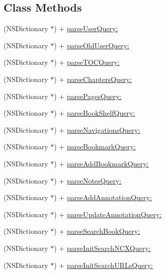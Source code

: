 \subsection*{Class Methods}
\begin{DoxyCompactItemize}
\item 
(N\-S\-Dictionary $\ast$) + \hyperlink{interface_pxe_player_query_parser_ad5159d6e940ef142f684fa4420a528b8}{parse\-User\-Query\-:}
\item 
(N\-S\-Dictionary $\ast$) + \hyperlink{interface_pxe_player_query_parser_aa19368a452433d48bd44fcba38e51d3d}{parse\-Old\-User\-Query\-:}
\item 
(N\-S\-Dictionary $\ast$) + \hyperlink{interface_pxe_player_query_parser_a186fec770cd3b8f5eafdbb41a3604bc4}{parse\-T\-O\-C\-Query\-:}
\item 
(N\-S\-Dictionary $\ast$) + \hyperlink{interface_pxe_player_query_parser_a476399acc086fa674d2c1edf8b5179fd}{parse\-Chapters\-Query\-:}
\item 
(N\-S\-Dictionary $\ast$) + \hyperlink{interface_pxe_player_query_parser_a59a7e2dc28f607676114cd72214fff6f}{parse\-Pages\-Query\-:}
\item 
(N\-S\-Dictionary $\ast$) + \hyperlink{interface_pxe_player_query_parser_a6cec34e5f394db53a90345d90b0da048}{parse\-Book\-Shelf\-Query\-:}
\item 
(N\-S\-Dictionary $\ast$) + \hyperlink{interface_pxe_player_query_parser_ae463836d9104d76e28c0fa210d9ebfa2}{parse\-Navigations\-Query\-:}
\item 
(N\-S\-Dictionary $\ast$) + \hyperlink{interface_pxe_player_query_parser_a37ddb8c7b49d82faeabfb492c3081b94}{parse\-Bookmark\-Query\-:}
\item 
(N\-S\-Dictionary $\ast$) + \hyperlink{interface_pxe_player_query_parser_ae28b3510a973a00402fea839b9615a5f}{parse\-Add\-Bookmark\-Query\-:}
\item 
(N\-S\-Dictionary $\ast$) + \hyperlink{interface_pxe_player_query_parser_a66c1cd746d73801bc8d9f33520875e9f}{parse\-Notes\-Query\-:}
\item 
(N\-S\-Dictionary $\ast$) + \hyperlink{interface_pxe_player_query_parser_aeb89878998be4b718598862eaf646084}{parse\-Add\-Annotation\-Query\-:}
\item 
(N\-S\-Dictionary $\ast$) + \hyperlink{interface_pxe_player_query_parser_a83c1711974bf7fe10fea6ab9e67ac3f6}{parse\-Update\-Annotation\-Query\-:}
\item 
(N\-S\-Dictionary $\ast$) + \hyperlink{interface_pxe_player_query_parser_ad962560be2926b159a80ff8b9aea951a}{parse\-Search\-Book\-Query\-:}
\item 
(N\-S\-Dictionary $\ast$) + \hyperlink{interface_pxe_player_query_parser_a8985c0790cd5fa5c2957a30b91b1727a}{parse\-Init\-Search\-N\-C\-X\-Query\-:}
\item 
(N\-S\-Dictionary $\ast$) + \hyperlink{interface_pxe_player_query_parser_afcacbc502617244d492b2b55e0627d50}{parse\-Init\-Search\-U\-R\-Ls\-Query\-:}
\end{DoxyCompactItemize}


